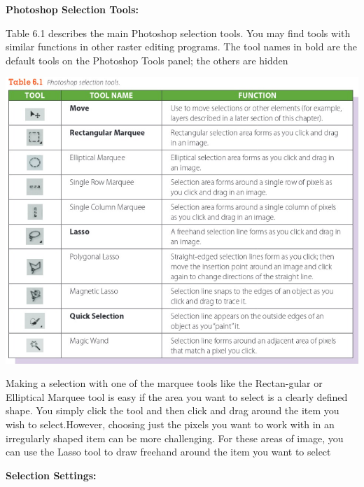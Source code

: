 \documentclass{report}
\begin{document}
    \bigbreak \noindent \bigbreak \noindent 
    \begin{large}
      \textbf{Photoshop Selection Tools:}
    \end{large}
    \bigbreak \noindent 
    Table 6.1 describes the main Photoshop selection tools. You may find tools with similar functions in other raster editing programs. The tool names in bold are the default tools on the Photoshop Tools panel; the others are hidden
    \bigbreak \noindent 
    \begin{center}
      \includegraphics[scale=0.5]{1.png}
    \end{center}
    \bigbreak \noindent 
    Making a selection with one of the marquee tools like the Rectan-gular or Elliptical Marquee tool is easy if the area you want to select is a clearly defined shape. You simply click the tool and then click and drag around the item you wish to select.However, choosing just the pixels you want to work with in an irregularly shaped item can be more challenging. For these areas of image, you can use the Lasso tool to draw freehand around the item you want to select
    \bigbreak \noindent 
    
    \bigbreak \noindent \bigbreak \noindent 
    \begin{Large}
      \textbf{Selection Settings:}
    \end{Large}
    
\end{document}
